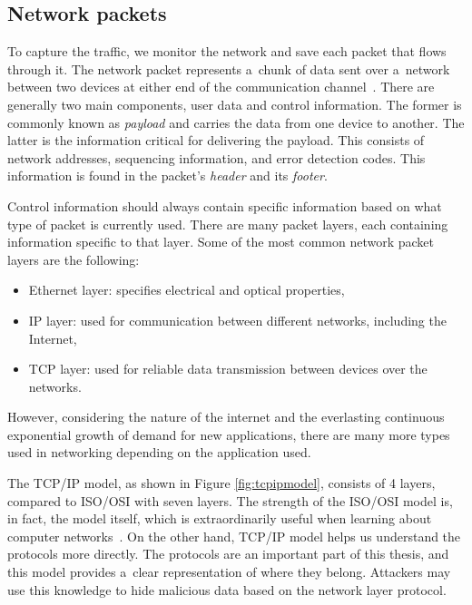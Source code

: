 \documentclass[
  printed,     %
  color,       %
  oneside,     %
  nosansbold,  %
  nocolorbold, %
  nolof,         %
  nolot,         %
]{fithesis4}
\begin{document}
\subsection{Network packets}

To capture the traffic, we monitor the network and save each packet that flows through it. The network packet represents a~chunk of data sent over a~network between two devices at either end of the communication channel~\cite{PacketMD39:online}. There are generally two main components, user data and control information. The former is commonly known as \textit{payload} and carries the data from one device to another. The latter is the information critical for delivering the payload. This consists of network addresses, sequencing information, and error detection codes. This information is found in the packet's \textit{header} and its \textit{footer}. 

Control information should always contain specific information based on what type of packet is currently used. There are many packet layers, each containing information specific to that layer. Some of the most common network packet layers are the following:

\begin{itemize}
    \item Ethernet layer: specifies electrical and optical properties,
    \item IP layer: used for communication between different networks, including the Internet,
    \item TCP layer: used for reliable data transmission between devices over the networks.
\end{itemize}

However, considering the nature of the internet and the everlasting continuous exponential growth of demand for new applications, there are many more types used in networking depending on the application used.

The TCP/IP model, as shown in Figure \ref{fig:tcpipmodel}, consists of 4 layers, compared to ISO/OSI with seven layers. The strength of the ISO/OSI model is, in fact, the model itself, which is extraordinarily useful when learning about computer networks~\cite{10.5555/2584507}. On the other hand, TCP/IP model helps us understand the protocols more directly. The protocols are an important part of this thesis, and this model provides a~clear representation of where they belong. Attackers may use this knowledge to hide malicious data based on the network layer protocol.
\end{document}
